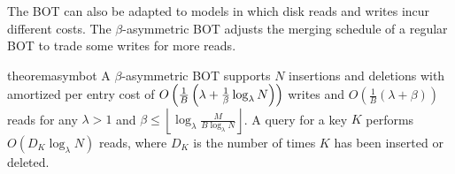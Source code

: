 
The BOT can also be adapted to models in which disk reads and writes incur
different costs. The $\beta$-asymmetric BOT adjusts the merging schedule of a
regular BOT to trade some writes for more reads.

\begin{restatable}{theorem}{asymbot}\label{thm:bot-asymmetric}
	A $\beta$-asymmetric BOT supports $N$ insertions and deletions with
	amortized per entry cost of $O\left(\frac{1}{B}\left(\lambda +
	\frac{1}{\beta}\log_{\lambda}{N} \right)\right)$ writes and
	$O\left(\frac{1}{B}\left(\lambda + \beta\right)\right)$ reads for any
	$\lambda > 1$ and $\beta \leq
	\left\lfloor\log_\lambda\frac{M}{B\log_\lambda N}\right\rfloor$. A query
	for a key $K$ performs $O(D_K\log_\lambda N)$ reads, where $D_K$ is the
	number of times $K$ has been inserted or deleted.
\end{restatable}
